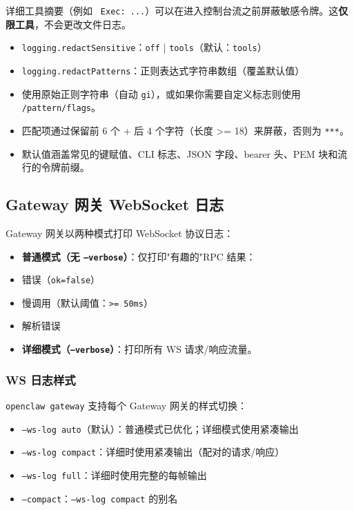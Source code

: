 详细工具摘要（例如 \texttt{ Exec: ...}）可以在进入控制台流之前屏蔽敏感令牌。这\textbf{仅限工具}，不会更改文件日志。

\begin{itemize}
  \item \texttt{logging.redactSensitive}：\texttt{off} | \texttt{tools}（默认：\texttt{tools}）
  \item \texttt{logging.redactPatterns}：正则表达式字符串数组（覆盖默认值）
  \item 使用原始正则字符串（自动 \texttt{gi}），或如果你需要自定义标志则使用 \texttt{/pattern/flags}。
  \item 匹配项通过保留前 6 个 + 后 4 个字符（长度 >= 18）来屏蔽，否则为 \texttt{***}。
  \item 默认值涵盖常见的键赋值、CLI 标志、JSON 字段、bearer 头、PEM 块和流行的令牌前缀。
\end{itemize}


\subsection{Gateway 网关 WebSocket 日志}


Gateway 网关以两种模式打印 WebSocket 协议日志：

\begin{itemize}
  \item \textbf{普通模式（无 \texttt{--verbose}）}：仅打印"有趣的"RPC 结果：
  \item 错误（\texttt{ok=false}）
  \item 慢调用（默认阈值：\texttt{>= 50ms}）
  \item 解析错误
  \item \textbf{详细模式（\texttt{--verbose}）}：打印所有 WS 请求/响应流量。
\end{itemize}


\subsubsection{WS 日志样式}


\texttt{openclaw gateway} 支持每个 Gateway 网关的样式切换：

\begin{itemize}
  \item \texttt{--ws-log auto}（默认）：普通模式已优化；详细模式使用紧凑输出
  \item \texttt{--ws-log compact}：详细时使用紧凑输出（配对的请求/响应）
  \item \texttt{--ws-log full}：详细时使用完整的每帧输出
  \item \texttt{--compact}：\texttt{--ws-log compact} 的别名
\end{itemize}


